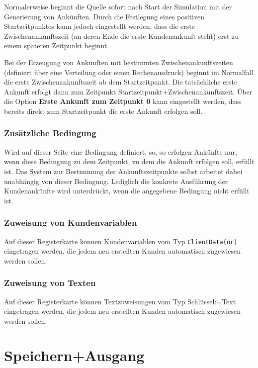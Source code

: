 Normalerweise beginnt die Quelle sofort nach Start der Simulation mit der Generierung von
Ankünften. Durch die Festlegung eines positiven Startzeitpunktes kann jedoch eingestellt
werden, dass die erste Zwischenankunftszeit (an deren Ende die erste Kundenankunft steht) erst
zu einem späteren Zeitpunkt beginnt.

Bei der Erzeugung von Ankünften mit bestimmten Zwischenankunftszeiten (definiert über eine Verteilung
oder einen Rechenausdruck) beginnt im Normalfall die erste Zwischenankunftszeit ab dem Startzeitpunkt.
Die tatsächliche erste Ankunft erfolgt dann zum Zeitpunkt Startzeitpunkt+Zwischenankunftszeit. Über
die Option \textbf{Erste Ankunft zum Zeitpunkt 0} kann eingestellt werden, dass bereits direkt zum
Startzeitpunkt die erste Ankunft erfolgen soll.

\subsubsection*{Zusätzliche Bedingung}

Wird auf dieser Seite eine Bedingung definiert, so, so erfolgen Ankünfte nur, wenn diese Bedingung
zu dem Zeitpunkt, zu dem die Ankunft erfolgen soll, erfüllt ist.
Das System zur Bestimmung der Ankunftszeitpunkte selbst arbeitet dabei unabhängig von dieser Bedingung.
Lediglich die konkrete Ausführung der Kundenankünfte wird unterdrückt, wenn die angegebene Bedingung nicht erfüllt ist.

\subsubsection*{Zuweisung von Kundenvariablen}

Auf dieser Registerkarte können Kundenvariablen vom Typ \texttt{ClientData(nr)} eingetragen werden,
die jedem neu erstellten Kunden automatisch zugewiesen werden sollen.

\subsubsection*{Zuweisung von Texten}

Auf dieser Registerkarte können Textzuweisungen vom Typ Schlüssel:=Text eingetragen werden,
die jedem neu erstellten Kunden automatisch zugewiesen werden sollen.


\section{Speichern+Ausgang}
\label{ref:ModelElementDisposeWithTable}

